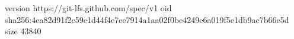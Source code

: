 version https://git-lfs.github.com/spec/v1
oid sha256:4ea82d91f2c59c1d44f4e7ee7914a1aa02f0be4249e6a019f5e1db9ac7b66e5d
size 43840
